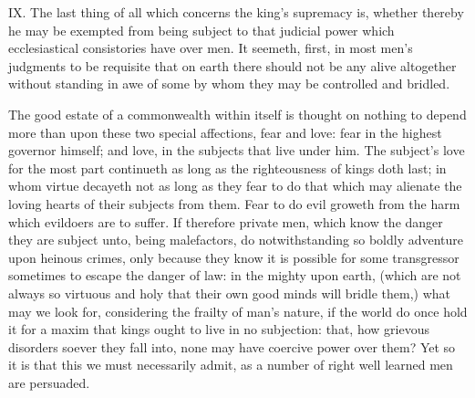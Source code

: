 IX. The last thing of all which concerns the king’s supremacy is, whether thereby he may be exempted from being subject to that judicial power which ecclesiastical consistories have over men. It seemeth, first, in most men’s judgments to be requisite that on earth there should not be any alive altogether without standing in awe of some by whom they may be controlled and bridled.

The good estate of a commonwealth within itself is thought on nothing to depend more than upon these two special affections, fear and love: fear in the highest governor himself; and love, in the subjects that live under him. The subject’s love for the most part continueth as long as the righteousness of  kings doth last; in whom virtue decayeth not as long as they fear to do that which may alienate the loving hearts of their subjects from them. Fear to do evil groweth from the harm which evildoers are to suffer. If therefore private men, which know the danger they are subject unto, being malefactors, do notwithstanding so boldly adventure upon heinous crimes, only because they know it is possible for some transgressor sometimes to escape the danger of law: in the mighty upon earth, (which are not always so virtuous and holy that their own good minds will bridle them,) what may we look for, considering the frailty of man’s nature, if the world do once hold it for a maxim that kings ought to live in no subjection: that, how grievous disorders soever they fall into, none may have coercive power over them? Yet so it is that this we must necessarily admit, as a number of right well learned men are persuaded.

